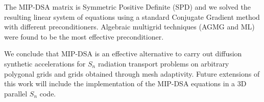 \documentclass[preprint,10pt]{elsarticle}
\renewcommand{\(}{\left(}
\renewcommand{\)}{\right)}
\renewcommand{\[}{\left[}
\renewcommand{\]}{\right]}
\newcommand{\sn}{\ensuremath{S_n}\xspace}
\begin{document}
The MIP-DSA  matrix is Symmetric Positive Definite (SPD) and we solved the resulting linear system 
of equations using a standard Conjugate Gradient method with different preconditioners. 
Algebraic multigrid techniques (AGMG and ML) were found to be the most
effective preconditioner.%

We conclude that MIP-DSA is an effective alternative to
carry out diffusion synthetic accelerations for \sn radiation transport problems on arbitrary polygonal grids and 
grids obtained through mesh adaptivity.
Future extensions of this work will include the implementation of the MIP-DSA equations in a 3D parallel \sn code.





%



\end{document}
